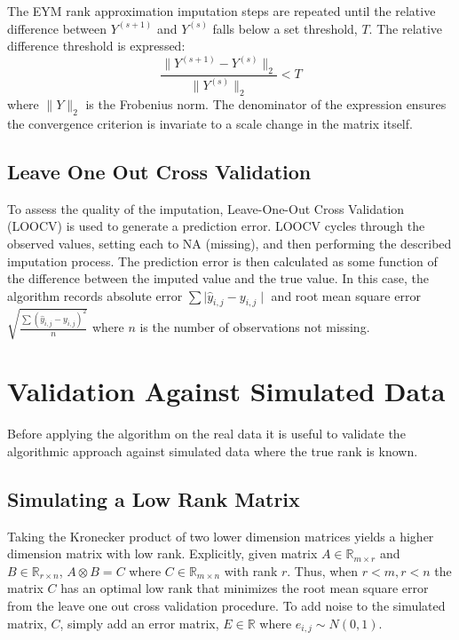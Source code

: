 \documentclass[12pt,twoside]{dukestatscithesis}
\theoremstyle{definition}
\theoremstyle{definition}
\theoremstyle{definition}
\theoremstyle{remark}
\begin{document}
The EYM rank approximation imputation steps are repeated until the
relative difference between \(Y^{(s+1)}\) and \(Y^{(s)}\) falls below a
set threshold, \(T\). The relative difference threshold is expressed:
\[\frac{\|Y^{(s+1)}-Y^{(s)}\|_2}{\|Y^{(s)}\|_2} < T\] where \(\|Y\|_2\)
is the Frobenius norm. The denominator of the expression ensures the
convergence criterion is invariate to a scale change in the matrix
itself.

\subsection{Leave One Out Cross
Validation}\label{leave-one-out-cross-validation}

To assess the quality of the imputation, Leave-One-Out Cross Validation
(LOOCV) is used to generate a prediction error. LOOCV cycles through the
observed values, setting each to NA (missing), and then performing the
described imputation process. The prediction error is then calculated as
some function of the difference between the imputed value and the true
value. In this case, the algorithm records absolute error
\(\sum \mid \hat y_{i,j} - y_{i,j}\mid\) and root mean square error
\(\sqrt{\frac{\sum (\hat y_{i,j} - y_{i,j})^2}{n}}\) where \(n\) is the
number of observations not missing.

\section{Validation Against Simulated
Data}\label{validation-against-simulated-data}

Before applying the algorithm on the real data it is useful to validate
the algorithmic approach against simulated data where the true rank is
known.

\subsection{Simulating a Low Rank
Matrix}\label{simulating-a-low-rank-matrix}

Taking the Kronecker product of two lower dimension matrices yields a
higher dimension matrix with low rank. Explicitly, given matrix
\(A \in \mathbb{R}_{m \times r}\) and \(B \in \mathbb{R}_{r \times n}\),
\(A \otimes B = C\) where \(C \in \mathbb{R}_{m \times n}\) with rank
\(r\). Thus, when \(r < m, r < n\) the matrix \(C\) has an optimal low
rank that minimizes the root mean square error from the leave one out
cross validation procedure. To add noise to the simulated matrix, \(C\),
simply add an error matrix, \(E \in \mathbb{R}\) where
\(e_{i,j} \sim N(0,1)\).
\end{document}
